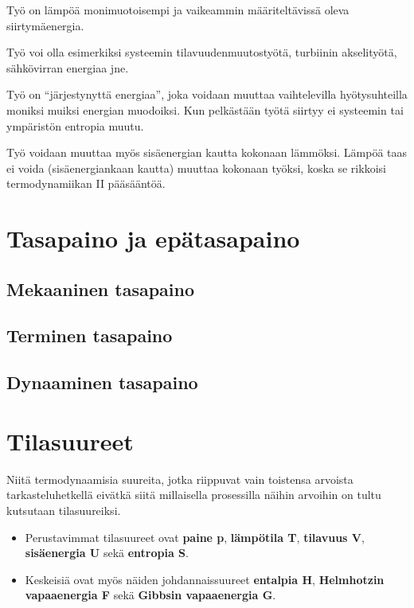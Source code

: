\documentclass[12pt,a4paper,finnish]{book}
\begin{document}
Työ on lämpöä monimuotoisempi ja vaikeammin määriteltävissä oleva siirtymäenergia. 

Työ voi olla esimerkiksi systeemin tilavuudenmuutostyötä, turbiinin akselityötä, 
sähkövirran energiaa jne.

Työ on ``järjestynyttä energiaa'', joka voidaan muuttaa vaihtelevilla hyötysuhteilla 
moniksi muiksi energian muodoiksi. Kun pelkästään työtä siirtyy ei systeemin tai ympäristön 
entropia muutu.

Työ voidaan muuttaa myös sisäenergian kautta kokonaan lämmöksi. Lämpöä taas ei voida 
(sisäenergiankaan kautta) muuttaa kokonaan työksi, koska se rikkoisi termodynamiikan 
II pääsääntöä.

\chapter{Tasapaino ja epätasapaino} %

\section{Mekaaninen tasapaino} %

\section{Terminen tasapaino} %

\section{Dynaaminen tasapaino} %


\chapter{Tilasuureet} \label{chapter:tilasuureet} %

Niitä termodynaamisia suureita, jotka riippuvat vain toistensa arvoista tarkasteluhetkellä 
eivätkä siitä millaisella prosessilla näihin arvoihin on tultu kutsutaan tilasuureiksi.

\begin{itemize}
 \item Perustavimmat tilasuureet ovat \textbf{paine p}, \textbf{lämpötila T}, 
    \textbf{tilavuus V}, \textbf{sisäenergia U} sekä \textbf{entropia S}.
 \item Keskeisiä ovat myös näiden johdannaissuureet \textbf{entalpia H}, 
  \textbf{Helmhotzin vapaaenergia F} sekä \textbf{Gibbsin vapaaenergia G}.
\end{itemize}
\end{document}
